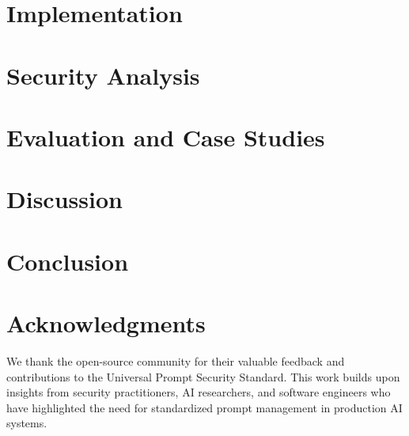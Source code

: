 \documentclass[11pt]{article}
\begin{document}
\section{Implementation}
\label{sec:implementation}


\section{Security Analysis}
\label{sec:security}


\section{Evaluation and Case Studies}
\label{sec:evaluation}


\section{Discussion}
\label{sec:discussion}


\section{Conclusion}
\label{sec:conclusion}


\section*{Acknowledgments}
We thank the open-source community for their valuable feedback and contributions to the Universal Prompt Security Standard. This work builds upon insights from security practitioners, AI researchers, and software engineers who have highlighted the need for standardized prompt management in production AI systems.



\end{document}
